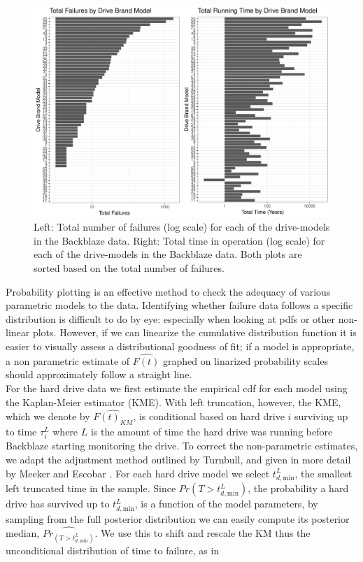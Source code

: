 \documentclass[12pt]{article}
\begin{document}
\begin{figure}[H]
\includegraphics[width=\textwidth]{fig/data_sum.pdf}
\caption{Left: Total number of failures (log scale) for each of the drive-models in the Backblaze data. Right: Total time in operation (log scale) for each of the drive-models in the Backblaze data.  Both plots are sorted based on the total number of failures.}
\label{fig1}
\end{figure}


Probability plotting is an effective method to check the adequacy of various parametric models to the data.  Identifying whether failure data follows a specific distribution is difficult to do by eye: especially when looking at pdfs or other non-linear plots.  However, if we can linearize the cumulative distribution function it is easier to visually assess a distributional goodness of fit; if a model is appropriate, a non parametric estimate of $\hat{F(t)}$ graphed on linarized probability scales should approximately follow a straight line. \\

For the hard drive data we first estimate the empirical cdf for each model using the Kaplan-Meier estimator (KME)\cite{kaplan}.  With left truncation, however, the KME, which we denote by $\widehat{F(t)_{KM}}$, is conditional based on hard drive $i$ surviving up to time $\tau_i^L$ where $L$ is the amount of time the hard drive was running before Backblaze starting monitoring the drive.  To correct the non-parametric estimates, we adapt the adjustment method outlined by Turnbull, and given in more detail by Meeker and Escobar \cite{turnbull,meeker}.  For each hard drive model we select $t_{d,\text{min}}^L$, the smallest left truncated time in the sample.  Since $Pr(T>t_{d,\text{min}}^L)$, the probability a hard drive has survived up to $t_{d,\text{min}}^L$, is a function of the model parameters, by sampling from the full posterior distribution we can easily compute its posterior median, $\widehat{Pr_(T>t_{d,\text{min}}^L)}$. We use this to shift and rescale the KM thus  the unconditional distribution of time to failure, as in
\end{document}
